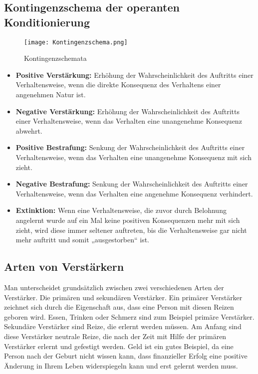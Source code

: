 \subsection{Kontingenzschema der operanten Konditionierung}	
\begin{center}
\begin{figure}[h]
	\centering
 \texttt{[image: Kontingenzschema.png]}
	\caption{Kontingenzschemata}
\end{figure}
\end{center}
\begin{itemize}
	\item \textbf{Positive Verstärkung:} Erhöhung der Wahrscheinlichkeit des Auftritts einer Verhaltensweise, wenn die direkte Konsequenz des Verhaltens einer angenehmen Natur ist. 
	\item \textbf{Negative Verstärkung:} Erhöhung der Wahrscheinlichkeit des Auftritts einer Verhaltensweise, wenn das Verhalten eine unangenehme Konsequenz abwehrt.
	\item \textbf{Positive Bestrafung:} Senkung der Wahrscheinlichkeit des Auftritts einer Verhaltensweise, wenn das Verhalten eine unangenehme Konsequenz mit sich zieht.
	\item \textbf{Negative Bestrafung:} Senkung der Wahrscheinlichkeit des Auftritts einer Verhaltensweise, wenn das Verhalten eine angenehme Konsequenz verhindert. 
	\item \textbf{Extinktion:} Wenn eine Verhaltensweise, die zuvor durch Belohnung angelernt wurde auf ein Mal keine positiven Konsequenzen mehr mit sich zieht, wird diese immer seltener auftreten, bis die Verhaltensweise gar nicht mehr auftritt und somit „ausgestorben“ ist. 
\end{itemize}
\subsection{Arten von Verstärkern}
Man unterscheidet grundsätzlich zwischen zwei verschiedenen Arten der Verstärker. Die primären und sekundären Verstärker. 
Ein primärer Verstärker zeichnet sich durch die Eigenschaft aus, dass eine Person mit diesen Reizen geboren wird. Essen, Trinken oder Schmerz sind zum Beispiel primäre Verstärker. 
Sekundäre Verstärker sind Reize, die erlernt werden müssen. Am Anfang sind diese Verstärker neutrale Reize, die nach der Zeit mit Hilfe der primären Verstärker erlernt und gefestigt werden. Geld ist ein gutes Beispiel, da eine Person nach der Geburt nicht wissen kann, dass finanzieller Erfolg eine positive Änderung in Ihrem Leben widerspiegeln kann und erst gelernt werden muss. 
